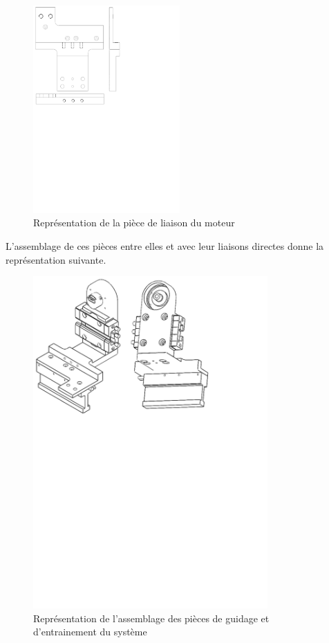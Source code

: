 \begin{figure}[H]
  \centering
  \includegraphics[width = 0.5\textwidth]{assets/figures/LiaisonMoteur.svg}
  \caption{Représentation de la pièce de liaison du moteur}
  \label{fig:LiaisonMoteur}
\end{figure}

L'assemblage de ces pièces entre elles et avec leur liaisons directes donne la représentation suivante.

\begin{figure}[H]
  \centering
  \includegraphics[width = 0.8\textwidth]{assets/figures/AssemblageGuidageEntrainement.svg}
  \caption{Représentation de l'assemblage des pièces de guidage et d'entrainement du système}
  \label{fig:AssGuiEntr}
\end{figure}

